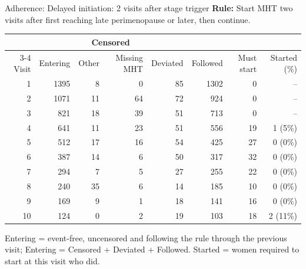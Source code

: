 \documentclass[aspectratio=169]{beamer}
\begin{document}
\begin{frame}{Adherence: Delayed initiation: 2 visits after stage trigger}
\centering
{\small \textbf{Rule:} Start MHT two visits after first reaching late perimenopause or later, then continue.}\par\vspace{6pt}
{\scriptsize
\begin{tabular}{r r r r r r r r}
\toprule
 & & \multicolumn{2}{c}{Censored} & & & & \\
\cmidrule(lr){3-4}
Visit & Entering & Other & Missing MHT & Deviated & Followed & Must start & Started (\%) \\
\midrule
1 & 1395 & 8 & 0 & 85 & 1302 & 0 & -- \\
2 & 1071 & 11 & 64 & 72 & 924 & 0 & -- \\
3 & 821 & 18 & 39 & 51 & 713 & 0 & -- \\
4 & 641 & 11 & 23 & 51 & 556 & 19 & 1 (5\%) \\
5 & 512 & 17 & 16 & 54 & 425 & 27 & 0 (0\%) \\
6 & 387 & 14 & 6 & 50 & 317 & 32 & 0 (0\%) \\
7 & 294 & 7 & 5 & 27 & 255 & 22 & 0 (0\%) \\
8 & 240 & 35 & 6 & 14 & 185 & 10 & 0 (0\%) \\
9 & 169 & 9 & 1 & 18 & 141 & 16 & 0 (0\%) \\
10 & 124 & 0 & 2 & 19 & 103 & 18 & 2 (11\%) \\
\bottomrule
\end{tabular}}
\par\vspace{6pt}
{\tiny Entering = event-free, uncensored and following the rule through the previous visit; Entering = Censored + Deviated + Followed. Started = women required to start at this visit who did.}
\end{frame}
\end{document}
